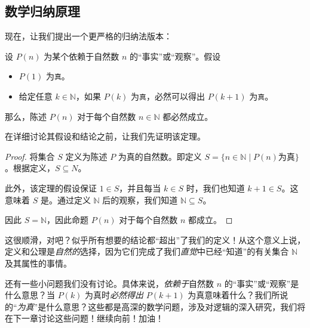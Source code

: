\subsection{数学归纳原理}\label{sec:section3.8.2}

现在，让我们提出一个更严格的归纳法版本：

\begin{theorem}[数学归纳原理]\label{theorem3.8}
    设 $P(n)$ 为某个依赖于自然数 $n$ 的``事实''或``观察''。假设
    \begin{itemize}
        \item $P(1)$ 为\verb|真|。
        \item 给定任意 $k \in \mathbb{N}$，如果 $P(k)$ 为\verb|真|，必然可以得出 $P(k+1)$ 为\verb|真|。
    \end{itemize}
    那么，陈述 $P(n)$ 对于每个自然数 $n \in \mathbb{N}$ 都必然成立。
\end{theorem}

在详细讨论其假设和结论之前，让我们先证明该定理。

\begin{proof}
    将集合 $S$ 定义为陈述 $P$ 为真的自然数。即定义 $S = \{n \in \mathbb{N} \mid P(n) \text{为真}\}$。根据定义，$S \subseteq N$。

    此外，该定理的假设保证 $1 \in S$，并且每当 $k \in S$ 时，我们也知道 $k + 1 \in S$。这意味着 $S$ 是。通过定义 $\mathbb{N}$ 后的观察，我们知道 $\mathbb{N} \subseteq S$。

    因此 $S = \mathbb{N}$，因此命题 $P(n)$ 对于每个自然数 $n$ 都成立。
\end{proof}

这很顺滑，对吧？似乎所有想要的结论都“超出”了我们的定义！从这个意义上说，定义和公理是\emph{自然的}选择，因为它们完成了我们\emph{直觉}中已经``知道''的有关集合 $\mathbb{N}$ 及其属性的事情。

还有一些小问题我们没有讨论。具体来说，\emph{依赖于}自然数 $n$ 的``事实''或``观察''是什么意思？当 $P(k)$ 为真时\emph{必然得出} $P(k + 1)$ 为真意味着什么？我们所说的``\emph{为真}''是什么意思？这些都是高深的数学问题，涉及对逻辑的深入研究，我们将在下一章讨论这些问题！继续向前！加油！
